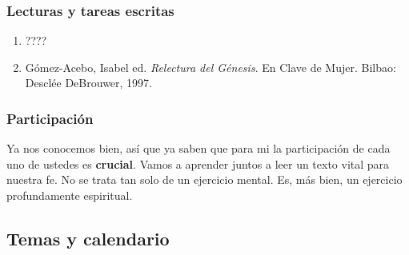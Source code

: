 \documentclass[letterpaper,12pt]{article}
\begin{document}
\subsubsection*{Lecturas y tareas escritas}
\begin{enumerate}
\item ????
\item Gómez-Acebo, Isabel ed. \emph{Relectura del Génesis}. En Clave de  Mujer. Bilbao: Desclée DeBrouwer, 1997.
\end{enumerate}

\subsubsection*{Participación}
Ya nos conocemos bien, así que ya saben que para mi la participación de cada uno de ustedes es \textbf{crucial}. Vamos a aprender juntos a leer un texto vital para nuestra fe. No se trata tan solo de un ejercicio mental. Es, más bien, un ejercicio profundamente espiritual. 


\subsection*{Temas y calendario}
\end{document}
